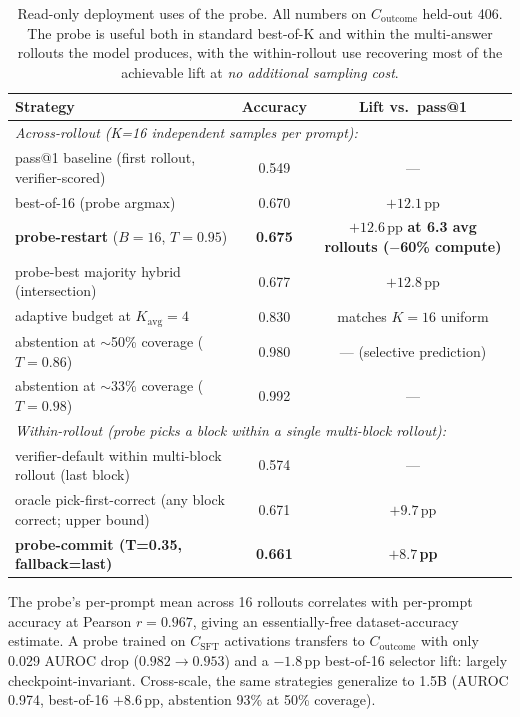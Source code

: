 \documentclass[11pt]{article}
\begin{document}
\begin{table}[h]
\centering
\small
\begin{tabular}{lcc}
\toprule
Strategy & Accuracy & Lift vs.\ pass@1 \\
\midrule
\multicolumn{3}{l}{\emph{Across-rollout (K=16 independent samples per prompt):}} \\
pass@1 baseline (first rollout, verifier-scored) & 0.549 & --- \\
best-of-16 (probe argmax) & 0.670 & $+12.1$\,pp \\
\textbf{probe-restart} ($B{=}16$, $T{=}0.95$) & \textbf{0.675} & $+12.6$\,pp \textbf{at 6.3 avg rollouts ($-$60\% compute)} \\
probe-best majority hybrid (intersection) & 0.677 & $+12.8$\,pp \\
adaptive budget at $K_{\text{avg}}{=}4$ & 0.830 & matches $K{=}16$ uniform \\
abstention at $\sim$50\% coverage ($T{=}0.86$) & 0.980 & --- (selective prediction) \\
abstention at $\sim$33\% coverage ($T{=}0.98$) & 0.992 & --- \\
\midrule
\multicolumn{3}{l}{\emph{Within-rollout (probe picks a block within a single multi-block rollout):}} \\
verifier-default within multi-block rollout (last block) & 0.574 & --- \\
oracle pick-first-correct (any block correct; upper bound) & 0.671 & $+9.7$\,pp \\
\textbf{probe-commit (T=0.35, fallback=last)} & \textbf{0.661} & \textbf{$+8.7$\,pp} \\
\bottomrule
\end{tabular}
\caption{Read-only deployment uses of the probe. All numbers on $C_{\text{outcome}}$ held-out 406. The probe is useful both in standard best-of-K and within the multi-answer rollouts the model produces, with the within-rollout use recovering most of the achievable lift at \emph{no additional sampling cost}.}
\end{table}

The probe's per-prompt mean across 16 rollouts correlates with per-prompt accuracy at Pearson $r{=}0.967$, giving an essentially-free dataset-accuracy estimate. A probe trained on $C_{\text{SFT}}$ activations transfers to $C_{\text{outcome}}$ with only 0.029 AUROC drop ($0.982 \to 0.953$) and a $-1.8$\,pp best-of-16 selector lift: largely checkpoint-invariant. Cross-scale, the same strategies generalize to 1.5B (AUROC 0.974, best-of-16 $+8.6$\,pp, abstention 93\% at 50\% coverage).
\end{document}
